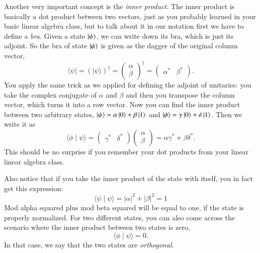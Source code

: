 Another very important concept is the \emph{inner product}. The inner product is basically a dot product between two vectors, just as you probably learned in your basic linear algebra class, but to talk about it in our notation first we have to define a \emph{bra}. Given a state $\ket{\psi}$, we can write down its bra, which is just its adjoint. So the bra of state $\ket{\psi}$ is given as the dagger of the original column vector,
\begin{equation}
\langle\psi|=(|\psi\rangle)^{\dagger}=\left(\begin{array}{l}
\alpha \\
\beta
\end{array}\right)^{\dagger}=\left(\begin{array}{ll}
\alpha^{*} & \beta^{*}
\end{array}\right).
\end{equation}
You apply the same trick as we applied for defining the adjoint of unitaries: you take the complex conjugate of $\alpha$ and $\beta$ and then you transpose the column vector, which turns it into a row vector. Now you can find the inner product between two arbitrary states, $\ket{\psi} = \alpha\ket{0} + \beta\ket{1}$ and $\ket{\phi} = \gamma\ket{0} + \delta\ket{1}$. Then we write it as 
\begin{equation}
\langle\phi \mid \psi\rangle=\left(\begin{array}{ll}
\gamma^{*} & \delta^{*}
\end{array}\right)\left(\begin{array}{c}
\alpha \\
\beta
\end{array}\right)=\alpha \gamma^{*}+\beta \delta^{*}.
\end{equation}
This should be no surprise if you remember your dot products from your linear linear algebra class.

Also notice that if you take the inner product of the state with itself, you in fact get this expression:
\begin{equation}
\langle\psi \mid \psi\rangle=|\alpha|^{2}+|\beta|^{2}=1
\end{equation}
Mod alpha squared plus mod beta squared will be equal to one, if the state is properly normalized. For two different states, you can also come across the scenario where the inner product between two states is zero,
\begin{equation}
\langle\phi \mid \psi\rangle=0.
\end{equation}
In that case, we say that the two states are \emph{orthogonal}.

